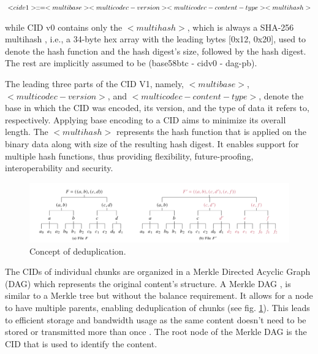 
\begin{flushleft}
\centering
$\textsc <cidv1> ::= <multibase><multicodec-version><multicodec-content-type><multihash>$
\end{flushleft}

while CID v0 contains only the \(\scriptstyle <multihash>\), which is always a SHA-256 multihash \citep{multiformat}, i.e., a 34-byte hex array with the leading bytes [0x12, 0x20], used to denote the hash function and the hash digest’s size, followed by the hash digest. The rest are implicitly assumed to be (base58btc - cidv0 - dag-pb).

The leading three parts of the CID V1, namely, \(\scriptstyle <multibase>\), \(\scriptstyle <multicodec-version>\), and \(\scriptstyle <multicodec-content-type>\), denote the base in which the CID was encoded, its version, and the type of data it refers to, respectively. Applying base encoding to a CID aims to minimize its overall length. The \(\scriptstyle <multihash>\) represents the hash function that is applied on the binary data along with size of the resulting hash digest. It enables support for multiple hash functions, thus providing flexibility, future-proofing, interoperability and security. %

\begin{figure}[htbp]
    \centerline{\includegraphics[width=\textwidth]{figs/deduplication.png}}
    \caption{Concept of deduplication. \citep{daniel_2022}}
    \label{fig:deduplication}
\end{figure}

The CIDs of individual chunks are organized in a Merkle Directed Acyclic Graph (DAG) which represents the original content's structure. A Merkle DAG \citep{benet_2014}, is similar to a Merkle tree but without the balance requirement. It allows for a node to have multiple parents, enabling deduplication of chunks (see fig. \ref{fig:deduplication}). This leads to efficient storage and bandwidth usage as the same content doesn't need to be stored or transmitted more than once \citep{trautwein_2022}. The root node of the Merkle DAG is the CID that is used to identify the content.

